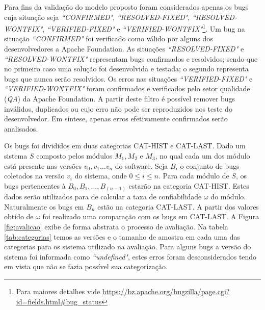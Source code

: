\documentclass[12pt]{article}
\begin{document}
Para fins da validação do modelo proposto foram considerados apenas os bugs cuja situação seja \textit{``CONFIRMED"}, \textit{``RESOLVED-FIXED"}, \textit{``RESOLVED-WONTFIX"}, \textit{``VERIFIED-FIXED"} e \textit{``VERIFIED-WONTFIX"}\footnote{Para maiores detalhes vide \url{https://bz.apache.org/bugzilla/page.cgi?id=fields.html#bug_status}}. Um bug na situação \textit{``CONFIRMED"} foi verificado como válido por alguns dos desenvolvedores a Apache Foundation. As situações \textit{``RESOLVED-FIXED"} e  \textit{``RESOLVED-WONTFIX"} representam bugs  confirmados e resolvidos; sendo que no primeiro caso uma solução foi desenvolvida e testada; o segundo representa bugs que nunca serão resolvidos. Os erros nas situações \textit{``VERIFIED-FIXED"} e \textit{``VERIFIED-WONTFIX"} foram confirmados e verificados pelo setor qualidade (\textit{QA}) da Apache Foundation. A partir deste filtro é possível remover bugs inválidos, duplicados ou cujo erro não pode ser reproduzidos nos teste do desenvolvedor. Em síntese, apenas erros efetivamente confirmados serão analisados.

Os bugs foi divididos em duas categorias \textsc{CAT-HIST} e \textsc{CAT-LAST}.
Dado um sistema $S$ composto pelos módulos $M_1, M_2$ e $M_3$, no qual cada um
dos módulo está presente nas versões $v_0, v_1 \ldots v_n$ do software.  Seja
$B_i$ o conjunto de bugs coletados na versão $v_i$ do sistema, onde $0 \leq i
\leq n${}. Para cada módulo de $S$, os bugs pertencentes à $B_0, B_1, \ldots,
B_{(n-1)}$  estarão na categoria \textsc{CAT-HIST}. Estes dados serão utilizados
para de calcular a taxa de confiabilidade $\omega$ do módulo. Naturalmente os
bugs em $B_n$ estão na categoria \textsc{CAT-LAST}. A partir dos valores obtido
de $\omega$ foi realizado uma comparação com os bugs em \textsc{CAT-LAST}. A
Figura \ref{fig:avalicao} exibe de forma abstrata o processo de avaliação. Na
tabela \ref{tab:categorias}{} temos as versões e o tamanho de amostra em cada
uma das categorias para os sistema utilizado na avaliação. Para alguns bugs a
versão do sistema foi informada como \textit{``undefined"}, estes erros foram
desconsiderados tendo em vista que não se fazia possível sua categorização.
\end{document}

